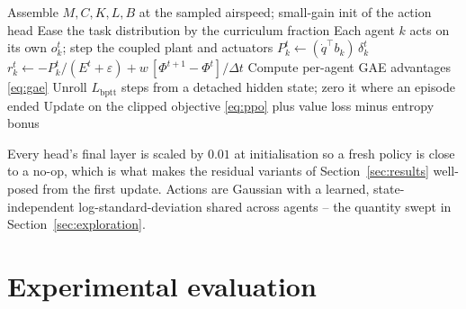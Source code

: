 \documentclass[preprint,11pt]{elsarticle}
\begin{document}
\begin{algorithm}[t]
\caption{Training with the blended (exact-plus-shaping) credit}
\label{alg:mocca}
\begin{algorithmic}[1]
\State Assemble $M,C,K,L,B$ at the sampled airspeed; small-gain init of the
action head
  \State Ease the task distribution by the curriculum fraction
    \State Each agent $k$ acts on its own $o_k^t$; step the coupled plant and
    actuators
    \State $P_k^t \gets (\dot q^\top b_k)\,\delta_k^t$
    \State $r_k^t \gets -P_k^t/(E^t+\varepsilon)
      + w\,[\Phi^{t+1}-\Phi^{t}]/\Delta t$
  \EndFor
  \State Compute per-agent GAE advantages \eqref{eq:gae}
    \State Unroll $L_{\mathrm{bptt}}$ steps from a detached hidden state; zero it
    where an episode ended
    \State Update on the clipped objective \eqref{eq:ppo} plus value loss
    minus entropy bonus
  \EndFor
\EndFor
\end{algorithmic}
\end{algorithm}

Every head's final layer is scaled by $0.01$ at
initialisation so a fresh policy is close to a no-op, which is what makes
the residual variants of Section~\ref{sec:results} well-posed from the
first update. Actions are Gaussian with a learned, state-independent
log-standard-deviation shared across agents -- the quantity swept in
Section~\ref{sec:exploration}.

\section{Experimental evaluation}
\label{sec:design}
\end{document}
